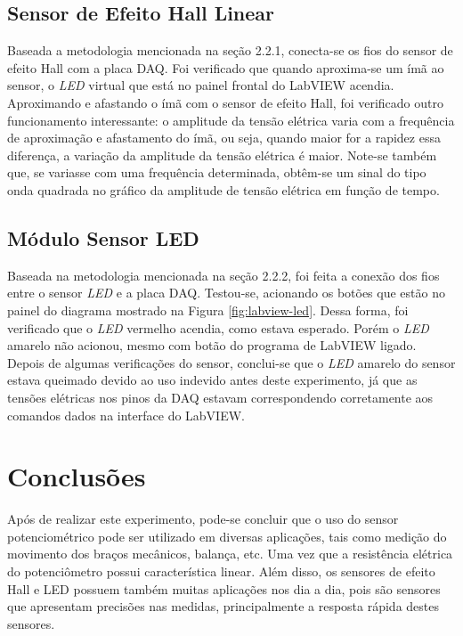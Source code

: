 \documentclass[a4paper]{instrumentacao}
\begin{document}



\section{Sensor de Efeito Hall Linear}
Baseada a metodologia mencionada na seção 2.2.1, conecta-se os fios do sensor de efeito Hall com a placa DAQ. Foi verificado que quando aproxima-se um ímã ao sensor, o \textit{LED} virtual que está no painel frontal do LabVIEW acendia. Aproximando e afastando o ímã com o sensor de efeito Hall, foi verificado outro funcionamento interessante: o amplitude da tensão elétrica varia com a frequência de aproximação e afastamento do ímã, ou seja, quando maior for a rapidez essa diferença, a variação da amplitude
da tensão elétrica é maior. Note-se também que, se variasse com uma frequência determinada, obtêm-se um sinal do tipo onda quadrada no gráfico da amplitude de tensão elétrica em função de tempo.

\section{Módulo Sensor LED}
Baseada na metodologia mencionada na seção 2.2.2, foi feita a conexão dos fios  entre o sensor \textit{LED} e a placa DAQ. Testou-se, acionando os botões que estão no painel do diagrama mostrado na Figura \ref{fig:labview-led}. Dessa forma, foi verificado que o \textit{LED} vermelho acendia, como estava esperado. Porém o \textit{LED} amarelo não acionou, mesmo com botão do programa de LabVIEW ligado. Depois de algumas verificações do sensor, conclui-se que o \textit{LED} amarelo do sensor estava queimado devido ao uso indevido antes deste experimento, já que as tensões elétricas nos pinos da DAQ estavam correspondendo corretamente aos comandos dados na interface do LabVIEW.

\chapter{Conclusões}

Após de realizar este experimento, pode-se concluir que o uso do sensor potenciométrico pode ser utilizado em diversas aplicações, tais como medição do movimento dos braços mecânicos, balança, etc. Uma vez que a resistência elétrica do potenciômetro possui característica linear. Além disso, os sensores de efeito Hall e LED possuem também muitas aplicações nos dia a dia, pois são sensores que apresentam precisões nas medidas, principalmente a resposta rápida destes sensores.
\end{document}

